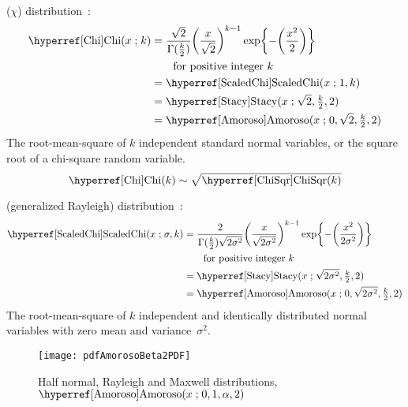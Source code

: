  ($\chi$) distribution~\cite{Johnson1994}:
%
\begin{align}
\label{Chi}
\opr{Chi}(x \given k) 
&= \frac{ \sqrt{2}}{\Gamma(\tfrac{k}{2})} { \Left(\frac{x}{\sqrt{2}}\Right)}^{k-1} 
\exp\Left\{ -\Left( \frac{x^2}{2}    \Right)\Right\} \checked
\\
& \qquad \text{for positive integer } k \notag \\
& = \opr{ScaledChi}(x\given 1,k) \notag \checked \\
&=  \opr{Stacy}(x\given \sqrt{2}, \sfrac{k}{2}, 2)  \notag \checked \\
&=  \opr{Amoroso}(x\given  0, \sqrt{2} , \sfrac{k}{2}, 2) \notag \checked
\end{align}
The root-mean-square of $k$ independent standard normal variables, or the square root of a chi-square random variable.
\[
\opr{Chi}(k) \sim \sqrt{\opr{ChiSqr}(k)} \checked
\notag
\]

 (generalized Rayleigh) distribution~\cite{Miller1964,Johnson1994}:
\begin{align}
\opr{ScaledChi}(x \given \sigma, k) 
&= \frac{2}{\Gamma(\tfrac{k}{2}) \sqrt{2\sigma^2}} { \Left(\frac{x}{\sqrt{2\sigma^2}}\Right)}^{k-1} 
\exp\Left\{-\Left(\frac{x^2}{2\sigma^2}\Right)\Right\} 
\notag \checked
\\
& \qquad \text{for positive integer } k \notag \checked \\
&=  \opr{Stacy}(x\given \sqrt{2\sigma^2}, \tfrac{k}{2},2)  \checked
\label{ScaledChi}
\\
&=  \opr{Amoroso}(x \given 0, \sqrt{2\sigma^2}, \tfrac{k}{2}, 2) \checked
\notag 
\end{align}
The root-mean-square of $k$ independent and identically distributed normal variables with zero mean and variance~$\sigma^2$. 


\begin{figure}[t]
\begin{center}
\texttt{[image: pdfAmorosoBeta2PDF]}
\end{center}
\caption[Half normal, Rayleigh and Maxwell distributions]{Half normal, Rayleigh and Maxwell distributions, $\opr{Amoroso}(x\given 0,1,\alpha,2)$}
\end{figure}



